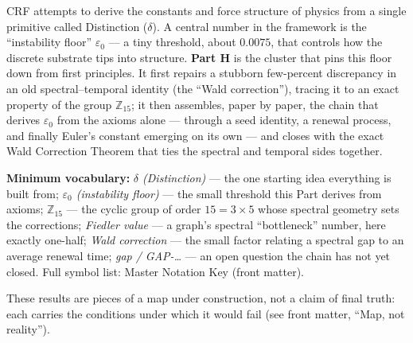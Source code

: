 \documentclass[12pt, a4paper]{article}
\begin{document}
\tableofcontents
\clearpage

\begin{keybox}[title={If you are just arriving --- Part H in plain language}]
\sloppy
CRF attempts to derive the constants and force structure of physics from a
single primitive called Distinction ($\delta$). A central number in the
framework is the ``instability floor'' $\varepsilon_0$ --- a tiny threshold,
about $0.0075$, that controls how the discrete substrate tips into structure.
\textbf{Part H} is the cluster that pins this floor down from first
principles. It first repairs a stubborn few-percent discrepancy in an old
spectral--temporal identity (the ``Wald correction''), tracing it to an exact
property of the group $\mathbb{Z}_{15}$; it then assembles, paper by paper,
the chain that derives $\varepsilon_0$ from the axioms alone --- through a
seed identity, a renewal process, and finally Euler's constant emerging on its
own --- and closes with the exact Wald Correction Theorem that ties the spectral
and temporal sides together.

\textbf{Minimum vocabulary:}
\textit{$\delta$ (Distinction)} --- the one starting idea everything is built
from;\;
\textit{$\varepsilon_0$ (instability floor)} --- the small threshold this Part
derives from axioms;\;
\textit{$\mathbb{Z}_{15}$} --- the cyclic group of order $15=3\times5$ whose
spectral geometry sets the corrections;\;
\textit{Fiedler value} --- a graph's spectral ``bottleneck'' number, here
exactly one-half;\;
\textit{Wald correction} --- the small factor relating a spectral gap to an
average renewal time;\;
\textit{gap / GAP-\dots} --- an open question the chain has not yet closed.
Full symbol list: Master Notation Key (front matter).

These results are pieces of a map under construction, not a claim of final
truth: each carries the conditions under which it would fail (see front
matter, ``Map, not reality'').
\end{keybox}

\clearpage
\end{document}
